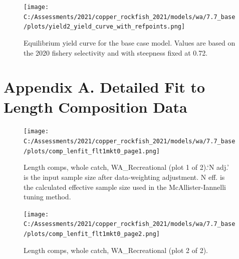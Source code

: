 \documentclass[11pt,
  english,
  a4paper,
]{article}
\begin{document}
\tagmcend\tagstructend


\begin{figure}
\centering
\texttt{[image: C:/Assessments/2021/copper\_rockfish\_2021/models/wa/7.7\_base/plots/yield2\_yield\_curve\_with\_refpoints.png]}
\caption{Equilibrium yield curve for the base case model. Values are based on the 2020 fishery selectivity and with steepness fixed at 0.72.\label{fig:yield}}
\end{figure}

\tagmcend\tagstructend

\clearpage


\hypertarget{length-fit}{%
\section{Appendix A. Detailed Fit to Length Composition Data}\label{length-fit}}

\leavevmode\tagmcend\tagstructend


\begin{figure}
\centering
\texttt{[image: C:/Assessments/2021/copper\_rockfish\_2021/models/wa/7.7\_base/plots/comp\_lenfit\_flt1mkt0\_page1.png]}
\caption{Length comps, whole catch, WA\_Recreational (plot 1 of 2).`N adj.' is the input sample size after data-weighting adjustment. N eff. is the calculated effective sample size used in the McAllister-Iannelli tuning method.\label{fig:comp_lenfit_flt1mkt0_page1}}
\end{figure}

\tagmcend\tagstructend


\begin{figure}
\centering
\texttt{[image: C:/Assessments/2021/copper\_rockfish\_2021/models/wa/7.7\_base/plots/comp\_lenfit\_flt1mkt0\_page2.png]}
\caption{Length comps, whole catch, WA\_Recreational (plot 2 of 2).\label{fig:comp_lenfit_flt1mkt0_page2}}
\end{figure}

\tagmcend\tagstructend
\end{document}
